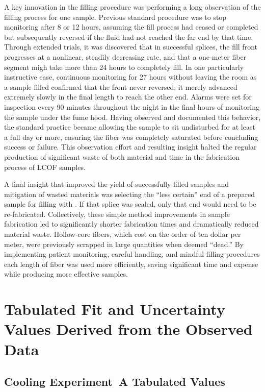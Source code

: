 A key innovation in the filling procedure was performing a long observation of the filling process for one sample. Previous standard procedure was to stop monitoring after 8 or 12 hours, assuming the fill process had ceased or completed but subsequently reversed if the fluid had not reached the far end by that time. Through extended trials, it was discovered that in successful splices, the fill front progresses at a nonlinear, steadily decreasing rate, and that a one-meter fiber segment migh take more than 24 hours to completely fill. In one particularly instructive case, continuous monitoring for 27 hours without leaving the room as a sample filled confirmed that the  front never reversed; it merely advanced extremely slowly in the final length to reach the other end. Alarms were set for inspection every 90 minutes throughout the night in the final hours of monitoring the sample under the fume hood. Having observed and documented this behavior, the standard practice became allowing the sample to sit undisturbed for at least a full day or more, ensuring the fiber was completely saturated before concluding success or failure. This observation effort and resulting insight halted the regular production of significant waste of both material and time in the fabrication process of \ac{LCOF} samples.

A final insight that improved the yield of successfully filled samples and mitigation of wasted materials was selecting the “less certain” end of a prepared sample for filling with . If that splice was sealed, only that end would need to be re-fabricated. Collectively, these simple method improvements in sample fabrication led to significantly shorter fabrication times and dramatically reduced material waste. Hollow-core fibers, which cost on the order of ten dollar per meter, were previously scrapped in large quantities when deemed “dead.” By implementing patient monitoring, careful handling, and mindful filling procedures each length of fiber was used more efficiently, saving significant time and expense while producing more effective samples.

\newpage

\section{Tabulated Fit and Uncertainty Values Derived from the Observed Data}
\label{Cooling:Appendix:sec:Tabulated Fit and Uncertainty Values Derived From the Experimental Data}

\subsection{Cooling Experiment~A Tabulated Values}
\label{Cooling:Appendix:subsec:Experiment A Tabulated Values}

